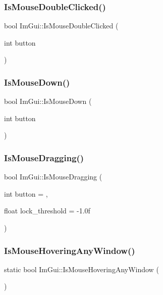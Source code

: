 \subsubsection{\texorpdfstring{Is\+Mouse\+Double\+Clicked()}{IsMouseDoubleClicked()}}
{\footnotesize\ttfamily bool Im\+Gui\+::\+Is\+Mouse\+Double\+Clicked (\begin{DoxyParamCaption}\item[{int}]{button }\end{DoxyParamCaption})}

\hypertarget{namespace_im_gui_a8ddf4d05de8ab8b9aa70906a22a9973e}{}\label{namespace_im_gui_a8ddf4d05de8ab8b9aa70906a22a9973e} 
\subsubsection{\texorpdfstring{Is\+Mouse\+Down()}{IsMouseDown()}}
{\footnotesize\ttfamily bool Im\+Gui\+::\+Is\+Mouse\+Down (\begin{DoxyParamCaption}\item[{int}]{button }\end{DoxyParamCaption})}

\hypertarget{namespace_im_gui_a7905828a024c6c005fa1887e62235ca4}{}\label{namespace_im_gui_a7905828a024c6c005fa1887e62235ca4} 
\subsubsection{\texorpdfstring{Is\+Mouse\+Dragging()}{IsMouseDragging()}}
{\footnotesize\ttfamily bool Im\+Gui\+::\+Is\+Mouse\+Dragging (\begin{DoxyParamCaption}\item[{int}]{button = {},  }\item[{float}]{lock\+\_\+threshold = {\ttfamily -\/1.0f} }\end{DoxyParamCaption})}

\hypertarget{namespace_im_gui_a183b8ebc12d5d90dacde5498043ccab9}{}\label{namespace_im_gui_a183b8ebc12d5d90dacde5498043ccab9} 
\subsubsection{\texorpdfstring{Is\+Mouse\+Hovering\+Any\+Window()}{IsMouseHoveringAnyWindow()}}
{\footnotesize\ttfamily static bool Im\+Gui\+::\+Is\+Mouse\+Hovering\+Any\+Window (\begin{DoxyParamCaption}{ }\end{DoxyParamCaption})\hspace{0.3cm}{\ttfamily [static]}}

